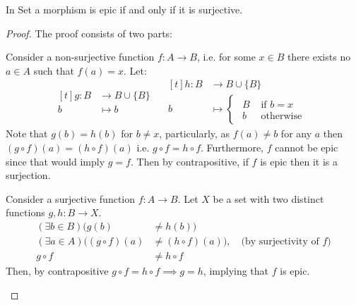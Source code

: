 \begin{theorem}\label{thm:epi_iff_sur}
  In Set a morphism is epic if and only if it is surjective.

  \begin{proof}
    The proof consists of two parts:
    \begin{subproof}[$(\implies)$]
      Consider a non-surjective function $f:A\to B$, i.e. for some $x\in B$
      there exists no $a\in A$ such that $f(a) = x$. Let:
      \[
        \begin{aligned}[t]
          g:B &\to B \cup \{B\}\\
          b &\mapsto b
        \end{aligned}
        \quad
        \begin{aligned}[t]
          h:B &\to B \cup \{B\}\\
          b &\mapsto
          \begin{cases}
            \begin{aligned}
              B &\text{ if } b = x\\
              b &\text{ otherwise}
            \end{aligned}
          \end{cases}
        \end{aligned}
      \]
      Note that $g(b) = h(b)$ for $b\neq x$, particularly, as $f(a)\neq b$ for
      any $a$ then $(g\circ f)(a) = (h\circ f)(a)$ i.e. $g\circ f = h\circ f$.
      Furthermore, $f$ cannot be epic since that would imply $g=f$.
      Then by contrapositive, if $f$ is epic then it is a surjection.
    \end{subproof}

    \begin{subproof}[$(\impliedby)$]
      Consider a surjective function $f:A\to B$. Let $X$ be a set with two
      distinct functions $g, h: B \to X$.
      \[
        \begin{aligned}
          (\exists b\in B)(g(b) &\neq h(b))\\
          (\exists a\in A)((g\circ f)(a) &\neq (h\circ f)(a))
          ,\quad\text{(by surjectivity of $f$)}\\
          g\circ f &\neq h\circ f
        \end{aligned}
      \]
      Then, by contrapositive $g\circ f = h\circ f \implies g=h$, implying
      that $f$ is epic.
    \end{subproof}
  \end{proof}
\end{theorem}

